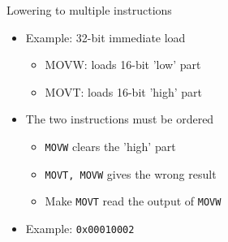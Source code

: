 \begin{frame}{Lowering to multiple instructions}

\begin{minipage}[t]{0.58\linewidth}
    \begin{itemize}
        \item Example: 32-bit immediate load
        \begin{itemize}
            \item MOVW: loads 16-bit 'low' part
            \item MOVT: loads 16-bit 'high' part
        \end{itemize}
        
        \item The two instructions must be ordered
        \begin{itemize}
            \item \texttt{MOVW} clears the 'high' part
            \item \texttt{MOVT, MOVW} gives the wrong result
            \item Make \texttt{MOVT} read the output of \texttt{MOVW}
        \end{itemize}
        \item Example: \texttt{0x00010002}
        

\end{itemize}
\end{minipage}
\end{frame}
